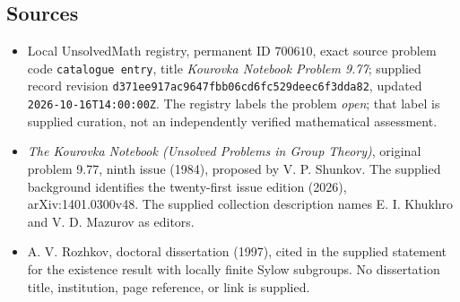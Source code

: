 \documentclass[11pt]{article}
\begin{document}
\subsection{Sources}
\begin{itemize}
\item Local UnsolvedMath registry, permanent ID \(700610\), exact source problem code \texttt{catalogue entry}, title \emph{Kourovka Notebook Problem 9.77}; supplied record revision \texttt{d371ee917ac9647fbb06cd6fc529deec6f3dda82}, updated \texttt{2026-10-16T14:00:00Z}. The registry labels the problem \emph{open}; that label is supplied curation, not an independently verified mathematical assessment.
\item \emph{The Kourovka Notebook (Unsolved Problems in Group Theory)}, original problem 9.77, ninth issue (1984), proposed by V. P. Shunkov. The supplied background identifies the twenty-first issue edition (2026), arXiv:1401.0300v48. The supplied collection description names E. I. Khukhro and V. D. Mazurov as editors.
\item A. V. Rozhkov, doctoral dissertation (1997), cited in the supplied statement for the existence result with locally finite Sylow subgroups. No dissertation title, institution, page reference, or link is supplied.
\end{itemize}
\end{document}
